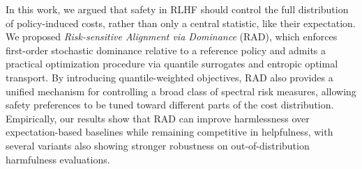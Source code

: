In this work, we argued that safety in RLHF should control the full distribution of policy-induced costs, rather than only a central statistic, like their expectation. We proposed \emph{Risk-sensitive Alignment via Dominance} (RAD), which enforces first-order stochastic dominance relative to a reference policy and admits a practical optimization procedure via quantile surrogates and entropic optimal transport.
By introducing quantile-weighted objectives, RAD also provides a unified mechanism for controlling a broad class of spectral risk measures, allowing safety preferences to be tuned toward different parts of the cost distribution.
Empirically, our results show that RAD can improve harmlessness over expectation-based baselines while remaining competitive in helpfulness, with several variants also showing stronger robustness on out-of-distribution harmfulness evaluations.

